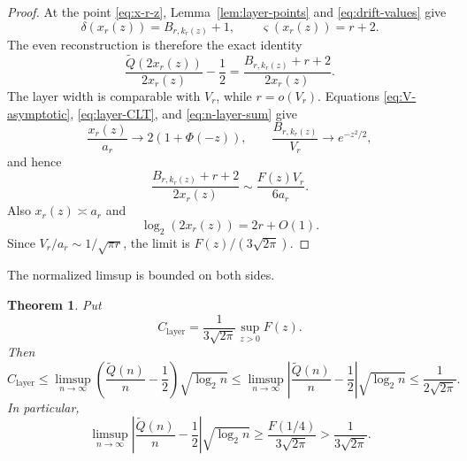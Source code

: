 \documentclass[11pt]{article}
\newtheorem{theorem}{Theorem}[section]
\theoremstyle{definition}
\theoremstyle{remark}
\newcommand{\Qt}{\widetilde Q}
\begin{document}
\begin{proof}
At the point \eqref{eq:x-r-z}, Lemma~\ref{lem:layer-points} and
\eqref{eq:drift-values} give
\[
 \delta(x_r(z))=B_{r,k_r(z)}+1,
 \qquad \varsigma(x_r(z))=r+2.
\]
The even reconstruction is therefore the exact identity
\[
 \frac{\Qt(2x_r(z))}{2x_r(z)}-\frac12
 =\frac{B_{r,k_r(z)}+r+2}{2x_r(z)}.
\]
The layer width is comparable with \(V_r\), while \(r=o(V_r)\).  Equations
\eqref{eq:V-asymptotic}, \eqref{eq:layer-CLT}, and
\eqref{eq:n-layer-sum} give
\[
 \frac{x_r(z)}{a_r}\longrightarrow2(1+\Phi(-z)),
 \qquad
 \frac{B_{r,k_r(z)}}{V_r}\longrightarrow e^{-z^2/2},
\]
and hence
\[
 \frac{B_{r,k_r(z)}+r+2}{2x_r(z)}
 \sim\frac{F(z)V_r}{6a_r}.
\]
Also \(x_r(z)\asymp a_r\) and
\[
 \log_2(2x_r(z))=2r+O(1).
\]
Since \(V_r/a_r\sim1/\sqrt{\pi r}\), the limit is
\(F(z)/(3\sqrt{2\pi})\).
\end{proof}

The normalized limsup is bounded on both sides.
\begin{theorem}
\label{thm:limsup-bounds}
Put
\begin{equation}
\label{eq:layer-constant}
 C_{\mathrm{layer}}
 =\frac1{3\sqrt{2\pi}}\sup_{z>0}F(z).
\end{equation}
Then
\begin{equation}
\label{eq:limsup-chain}
 C_{\mathrm{layer}}
 \leq\limsup_{n\to\infty}
 \left(\frac{\Qt(n)}n-\frac12\right)\sqrt{\log_2 n}
 \leq\limsup_{n\to\infty}
 \left|\frac{\Qt(n)}n-\frac12\right|\sqrt{\log_2 n}
 \leq\frac1{2\sqrt{2\pi}}.
\end{equation}
In particular,
\begin{equation}
\label{eq:layer-strict-lower}
 \limsup_{n\to\infty}
 \left|\frac{\Qt(n)}n-\frac12\right|\sqrt{\log_2 n}
 \geq\frac{F(1/4)}{3\sqrt{2\pi}}
 >\frac1{3\sqrt{2\pi}}.
\end{equation}
\end{theorem}
\end{document}
